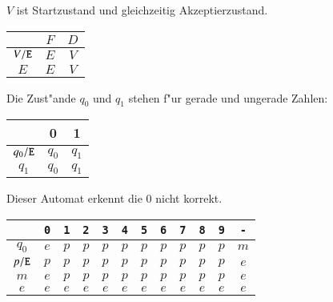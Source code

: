 \begin{beispiel}[\bf Drehkreuz] $V$ ist Startzustand und gleichzeitig
Akzeptierzustand.

\begin{center}
\begin{tabular}{|c|cc|}
\hline
&$F$&$D$\\
\hline
$V{\tt /E}$&$E$&$V$\\
$E$&$E$&$V$\\
\hline
\end{tabular}
\end{center}

\end{beispiel}

\begin{beispiel} Die
Zust"ande $q_0$ und $q_1$ stehen f"ur gerade und ungerade Zahlen:

\begin{center}
\begin{tabular}{|c|cc|}
\hline
&0&1\\
\hline
$q_0{\tt /E}$&$q_0$&$q_1$\\
$q_1$&$q_0$&$q_1$\\
\hline
\end{tabular}
\end{center}

\end{beispiel}

\begin{beispiel} Dieser Automat erkennt die $0$
nicht korrekt.

\begin{center}
\begin{tabular}{|c|ccccccccccc|}
\hline
&\tt 0&\tt 1&\tt 2&\tt 3&\tt 4&\tt 5&\tt 6&\tt 7&\tt 8&\tt 9&\tt -\\
\hline
$q_0$&$e$&$p$&$p$&$p$&$p$&$p$&$p$&$p$&$p$&$p$&$m$\\
$p{\tt /E}$&$p$&$p$&$p$&$p$&$p$&$p$&$p$&$p$&$p$&$p$&$e$\\
$m$&$e$&$p$&$p$&$p$&$p$&$p$&$p$&$p$&$p$&$p$&$e$\\
$e$&$e$&$e$&$e$&$e$&$e$&$e$&$e$&$e$&$e$&$e$&$e$\\
\hline
\end{tabular}
\end{center}

\end{beispiel}

